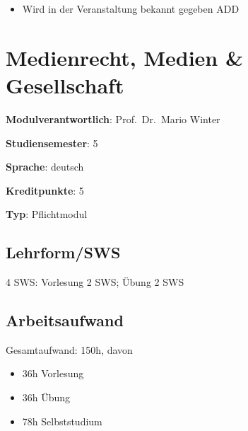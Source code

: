 \begin{itemize}
\tightlist
\item
  Wird in der Veranstaltung bekannt gegeben ADD
\end{itemize}

\hypertarget{medienrecht-medien-gesellschaftpathlabelmi-2017modulbeschreibungen-bachelorba_mug}{%
\chapter{Medienrecht, Medien \&
Gesellschaft\label{/mi-2017/modulbeschreibungen-bachelor/BA_MUG}}\label{medienrecht-medien-gesellschaftpathlabelmi-2017modulbeschreibungen-bachelorba_mug}}

\begin{modulHead}
\textbf{Modulverantwortlich}: Prof.~Dr.~Mario
Winter
\end{modulHead}
\begin{modulHead}
\textbf{Studiensemester}:
5
\end{modulHead}
\begin{modulHead}
\textbf{Sprache}:
deutsch
\end{modulHead}
\begin{modulHead}
\textbf{Kreditpunkte}:
5
\end{modulHead}
\begin{modulHead}
\textbf{Typ}:
Pflichtmodul
\end{modulHead}


\hypertarget{lehrformswspathlabelmi-2017modulbeschreibungen-bachelorba_mug}{%
\section*{Lehrform/SWS\label{/mi-2017/modulbeschreibungen-bachelor/BA_MUG}}\label{lehrformswspathlabelmi-2017modulbeschreibungen-bachelorba_mug}}

4 SWS: Vorlesung 2 SWS; Übung 2 SWS

\hypertarget{arbeitsaufwandpathlabelmi-2017modulbeschreibungen-bachelorba_mug}{%
\section*{Arbeitsaufwand\label{/mi-2017/modulbeschreibungen-bachelor/BA_MUG}}\label{arbeitsaufwandpathlabelmi-2017modulbeschreibungen-bachelorba_mug}}

Gesamtaufwand: 150h, davon

\begin{itemize}
\tightlist
\item
  36h Vorlesung
\item
  36h Übung
\item
  78h Selbststudium
\end{itemize}

